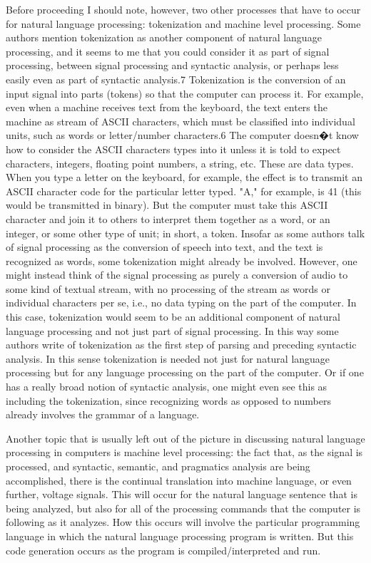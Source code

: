 Before proceeding I should note, however, two other processes that have to occur for natural language processing: tokenization and machine level processing. Some authors mention tokenization as another component of natural language processing, and it seems to me that you could consider it as part of signal processing, between signal processing and syntactic analysis, or perhaps less easily even as part of syntactic analysis.7 Tokenization is the conversion of an input signal into parts (tokens) so that the computer can process it. For example, even when a machine receives text from the keyboard, the text enters the machine as stream of ASCII characters, which must be classified into individual units, such as words or letter/number characters.6 The computer doesn�t know how to consider the ASCII characters types into it unless it is told to expect characters, integers, floating point numbers, a string, etc. These are data types. When you type a letter on the keyboard, for example, the effect is to transmit an ASCII character code for the particular letter typed. "A," for example, is 41 (this would be transmitted in binary). But the computer must take this ASCII character and join it to others to interpret them together as a word, or an integer, or some other type of unit; in short, a token. Insofar as some authors talk of signal processing as the conversion of speech into text, and the text is recognized as words, some tokenization might already be involved. However, one might instead think of the signal processing as purely a conversion of audio to some kind of textual stream, with no processing of the stream as words or individual characters per se, i.e., no data typing on the part of the computer. In this case, tokenization would seem to be an additional component of natural language processing and not just part of signal processing. In this way some authors write of tokenization as the first step of parsing and preceding syntactic analysis. In this sense tokenization is needed not just for natural language processing but for any language processing on the part of the computer. Or if one has a really broad notion of syntactic analysis, one might even see this as including the tokenization, since recognizing words as opposed to numbers already involves the grammar of a language.

Another topic that is usually left out of the picture in discussing natural language processing in computers is machine level processing: the fact that, as the signal is processed, and syntactic, semantic, and pragmatics analysis are being accomplished, there is the continual translation into machine language, or even further, voltage signals. This will occur for the natural language sentence that is being analyzed, but also for all of the processing commands that the computer is following as it analyzes. How this occurs will involve the particular programming language in which the natural language processing program is written. But this code generation occurs as the program is compiled/interpreted and run.

